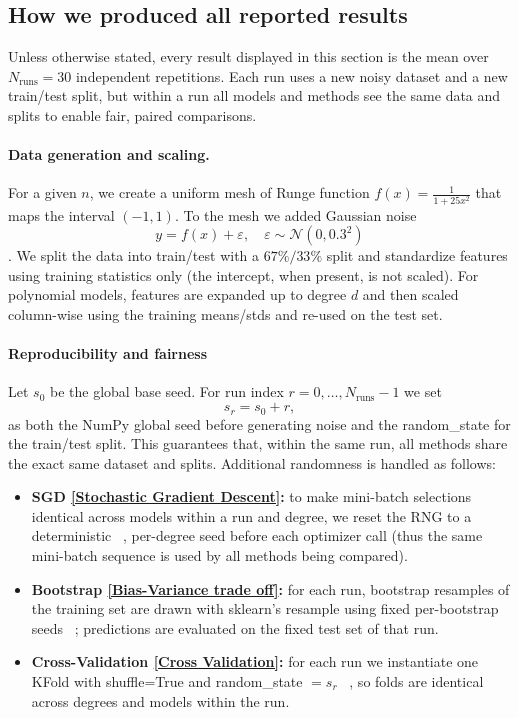 \documentclass[
 reprint,            %
 amsmath,amssymb,
 aps,
]{revtex4-2}
\begin{document}
\subsection*{How we produced all reported results}
\label{sec:results_setup}
Unless otherwise stated, every result displayed in this section is the mean over $N_{\text{runs}}=30$ independent repetitions. Each run uses a new noisy dataset and a new train/test split, but within a run all models and methods see the same data and splits to enable fair, paired comparisons.

\paragraph*{Data generation and scaling.}
For a given $n$, we create a uniform mesh of Runge function $f(x)=\tfrac{1}{1+25x^2}$ that maps the interval $(-1,1)$. To the mesh we added Gaussian noise \[ y = f(x) + \varepsilon, \quad \varepsilon \sim \mathcal{N}(0, 0.3^2) \]. We split the data into train/test with a $67\%/33\%$ split and standardize features using training statistics only (the intercept, when present, is not scaled). For polynomial models, features are expanded up to degree $d$ and then scaled column-wise using the training means/stds and re-used on the test set.

\paragraph*{Reproducibility and fairness}
Let $s_0$ be the global base seed. For run index $r=0,\dots,N_{\text{runs}}-1$ we set
\[
s_r = s_0 + r,
\]
as both the NumPy global seed before generating noise and the random\_state for the train/test split. This guarantees that, within the same run, all methods share the exact same dataset and splits. Additional randomness is handled as follows:
\begin{itemize}
    \item \textbf{SGD \ref{Stochastic Gradient Descent}:} to make mini-batch selections identical across models within a run and degree, we reset the RNG to a deterministic ~\cite{numpy-seed}, per-degree seed before each optimizer call (thus the same mini-batch sequence is used by all methods being compared).
    \item \textbf{Bootstrap \ref{Bias-Variance trade off}:} for each run, bootstrap resamples of the training set are drawn with sklearn's resample using fixed per-bootstrap seeds ~\cite{scikit-learn-resample}; predictions are evaluated on the fixed test set of that run.
    \item \textbf{Cross-Validation \ref{Cross Validation}:} for each run we instantiate one KFold with shuffle=True and random\_state $=s_r$ ~\cite{scikit-learn-crossvalidation}, so folds are identical across degrees and models within the run.
\end{itemize}
\end{document}
